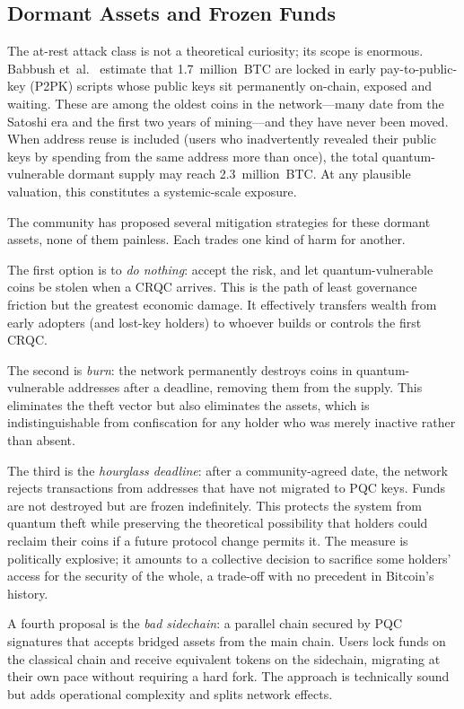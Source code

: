 \subsection{Dormant Assets and Frozen Funds}
\label{subsec:frozen-funds}

The at-rest attack class is not a theoretical curiosity; its scope is enormous.  Babbush et~al.~\cite{BabbushZalcmanGidney2026} estimate that 1.7~million~BTC are locked in early pay-to-public-key (P2PK) scripts whose public keys sit permanently on-chain, exposed and waiting.  These are among the oldest coins in the network---many date from the Satoshi era and the first two years of mining---and they have never been moved.  When address reuse is included (users who inadvertently revealed their public keys by spending from the same address more than once), the total quantum-vulnerable dormant supply may reach 2.3~million~BTC.  At any plausible valuation, this constitutes a systemic-scale exposure.

The community has proposed several mitigation strategies for these dormant assets, none of them painless.  Each trades one kind of harm for another.

The first option is to \emph{do nothing}: accept the risk, and let quantum-vulnerable coins be stolen when a CRQC arrives.  This is the path of least governance friction but the greatest economic damage.  It effectively transfers wealth from early adopters (and lost-key holders) to whoever builds or controls the first CRQC.

The second is \emph{burn}: the network permanently destroys coins in quantum-vulnerable addresses after a deadline, removing them from the supply.  This eliminates the theft vector but also eliminates the assets, which is indistinguishable from confiscation for any holder who was merely inactive rather than absent.

The third is the \emph{hourglass deadline}: after a community-agreed date, the network rejects transactions from addresses that have not migrated to PQC keys.  Funds are not destroyed but are frozen indefinitely.  This protects the system from quantum theft while preserving the theoretical possibility that holders could reclaim their coins if a future protocol change permits it.  The measure is politically explosive; it amounts to a collective decision to sacrifice some holders' access for the security of the whole, a trade-off with no precedent in Bitcoin's history.

A fourth proposal is the \emph{bad sidechain}: a parallel chain secured by PQC signatures that accepts bridged assets from the main chain.  Users lock funds on the classical chain and receive equivalent tokens on the sidechain, migrating at their own pace without requiring a hard fork.  The approach is technically sound but adds operational complexity and splits network effects.


